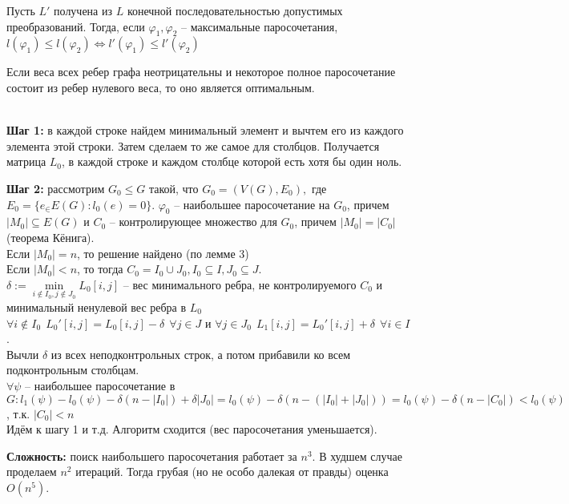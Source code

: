 	\begin{Rem}
		Пусть $L'$ получена из $L$ конечной последовательностью допустимых преобразований. Тогда, если
		$\varphi_1, \varphi_2$ -- максимальные паросочетания, $l(\varphi_1) \leqslant l(\varphi_2)
		\Leftrightarrow l'(\varphi_1) \leqslant l'(\varphi_2)$
	\end{Rem}

	\begin{Lm}
		Если веса всех ребер графа неотрицательны и некоторое полное паросочетание состоит из ребер нулевого
		веса, то оно является оптимальным.  
	\end{Lm}

	\\
	\textbf{Шаг 1:} в каждой строке найдем минимальный элемент и вычтем его из каждого элемента этой строки. Затем сделаем то же самое 
	для столбцов. Получается матрица $L_0$, в каждой строке и каждом столбце которой есть хотя бы один ноль. 

	\textbf{Шаг 2:} рассмотрим $G_0 \leqslant G$ такой, что $G_0 = (V(G), E_0),$ где $E_0 = 
	\{e_ \in E(G): l_0(e) = 0\}$. $\varphi_0$ -- наибольшее паросочетание на $G_0$, причем $|M_0|
	\subseteq E(G)$ и $C_0$ -- контролирующее множество для $G_0$, причем $|M_0| = |C_0|$ (теорема Кёнига).\\
	Если $|M_0| = n$, то решение найдено (по лемме 3)\\
	Если $|M_0| < n$, то тогда $C_0 = I_0 \cup J_0, I_0 \subseteq I, J_0 \subseteq J$.\\ 
	$\delta := \underset{i \notin I_0, j \notin J_0}{\min} L_0[i,j]$ -- вес минимального ребра, не 
	контролируемого $C_0$ и минимальный ненулевой вес ребра в $L_0$\\
	$\forall i \notin I_0 \ \ L_0'[i,j] = L_0[i,j] - \delta \ \ \forall j \in J$ и 
	$\forall j \in J_0 \ \ L_1 [i,j] = L_0' [i,j] + \delta \ \ \forall i \in I$.\\
	Вычли $\delta$ из всех неподконтрольных строк, а потом прибавили ко всем подконтрольным столбцам.\\
	$\forall \psi$ -- наибольшее паросочетание в $G: l_1(\psi) - l_0(\psi) - \delta(n-|I_0|)
	+ \delta |J_0| = l_0(\psi) - \delta(n - (|I_0| + |J_0|)) = l_0(\psi) - \delta (n - |C_0|)
	< l_0 (\psi)$, т.к. $|C_0| < n$\\
	Идём к шагу 1 и т.д. Алгоритм сходится (вес паросочетания уменьшается). 

	\textbf{Сложность:}  поиск наибольшего паросочетания работает за $n^3$. В худшем случае проделаем $n^2$ итераций. 
	Тогда грубая (но не особо далекая от правды) оценка $O(n^5)$.

